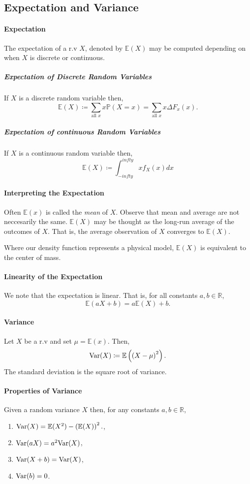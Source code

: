 \subsection{Expectation and Variance}

\paragraph{Expectation}
The expectation of a r.v \(X\), denoted by \(\mathbb{E}(X)\) may be
computed depending on when \(X\) is discrete or continuous.
\subparagraph{Expectation of Discrete Random Variables}
If \(X\) is a discrete random variable then,
\[
    \mathbb{E}(X) \coloneqq
    \sum_{\text{all } x} x \mathbb{P}(X = x)
    =
    \sum_{\text{all } x} x\Delta F_x(x).
\]
\subparagraph{Expectation of continuous Random Variables}
If \(X\) is a continuous random variable then,
\[
    \mathbb{E}(X) \coloneqq
    \int_{-infty}^{infty} x f_X(x)dx
\]

\paragraph{Interpreting the Expectation}
Often \(\mathbb{E}(x)\) is called the \textit{mean} of \(X\).
Observe that mean and average are not neccesarily the same.
\(\mathbb{E}(X)\) may be thought as the long-run average of
the outcomes of \(X\). That is, the average observation of 
\(X\) converges to \(\mathbb{E}(X)\).

Where our density function represents a physical model, \(\mathbb{E}(X)\)
is equivalent to the center of mass.


\paragraph{Linearity of the Expectation}
We note that the expectation is linear. That is, for all constants
\(a, b \in \mathbb{R}\),
\[
    \mathbb{E}(aX + b) = a \mathbb{E}(X) + b.
\]

\paragraph{Variance}
Let \(X\) be a r.v and set \(\mu = \mathbb{E}(x)\).
Then,
\[
    \mathrm{Var}(X) \coloneqq
    \mathbb{E}\left(
        \left(X - \mu \right)^2
    \right).
\]
The standard deviation is the square root of variance.

\paragraph{Properties of Variance}
Given a random variance \(X\) then, for any constants
\(a, b \in \mathbb{R}\),
\begin{enumerate}
    \item \(\mathrm{Var}(X) = \mathbb{E}(X^2) - \left(\mathbb{E}(X)\right)^2.\),
    \item \(\mathrm{Var}(aX) = a^2 \mathrm{Var}(X)\),
    \item \(\mathrm{Var}(X + b) = \mathrm{Var}(X)\),
    \item \(\mathrm{Var}(b) = 0\).
\end{enumerate}
